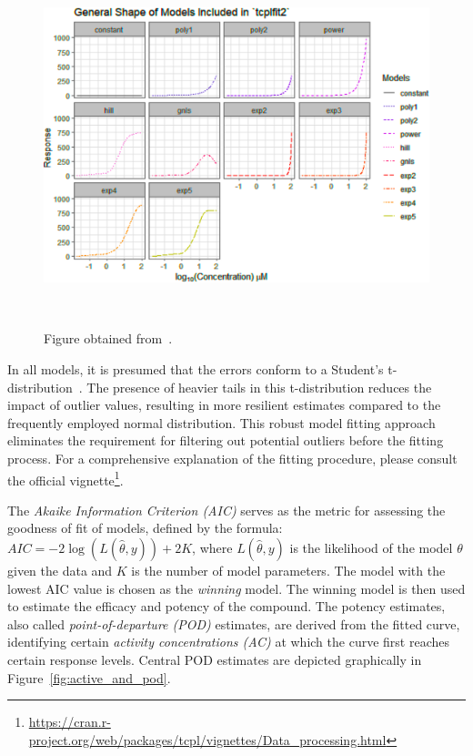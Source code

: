 \begin{figure}
    \centering
    \includegraphics[width=1\textwidth]{figures/fit_models.png}
    \caption{Figure obtained from~\cite{tcplv3.0}.}
~\label{fig:tcplfit2_models}
\end{figure}


In all models, it is presumed that the errors conform to a Student's t-distribution~\cite{tcplv3.0}. The presence of heavier tails in this t-distribution reduces the impact of outlier values, resulting in more resilient estimates compared to the frequently employed normal distribution. This robust model fitting approach eliminates the requirement for filtering out potential outliers before the fitting process. For a comprehensive explanation of the fitting procedure, please consult the official vignette\footnote{\url{https://cran.r-project.org/web/packages/tcpl/vignettes/Data_processing.html}}.

The \emph{Akaike Information Criterion (AIC)} serves as the metric for assessing the goodness of fit of models, defined by the formula: $AIC = -2\log(L(\hat{\theta}, y)) + 2K$, where $L(\hat{\theta}, y)$ is the likelihood of the model $\theta$ given the data and $K$ is the number of model parameters. The model with the lowest AIC value is chosen as the \emph{winning} model. The winning model is then used to estimate the efficacy and potency of the compound. The potency estimates, also called \emph{point-of-departure (POD)} estimates, are derived from the fitted curve, identifying certain \emph{activity concentrations (AC)} at which the curve first reaches certain response levels. Central POD estimates are depicted graphically in Figure~\ref{fig:active_and_pod}.

